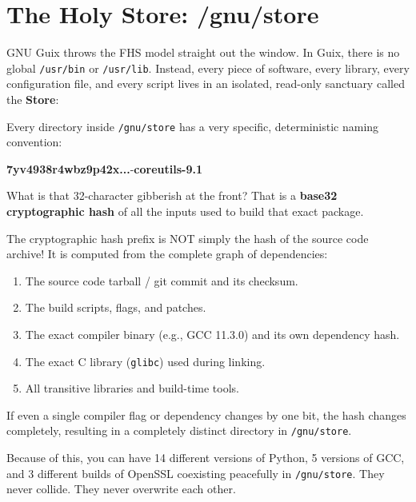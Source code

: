 \section{The Holy Store: /gnu/store}

GNU Guix throws the FHS model straight out the window. In Guix, there is no global \texttt{/usr/bin} or \texttt{/usr/lib}. Instead, every piece of software, every library, every configuration file, and every script lives in an isolated, read-only sanctuary called the \textbf{Store}:

\begin{center}
\end{center}

Every directory inside \texttt{/gnu/store} has a very specific, deterministic naming convention:

\begin{center}
\textbf{\color{alchpurple}7yv4938r4wbz9p42x...}-\textbf{\color{guixdark}coreutils-9.1}
\end{center}

What is that 32-character gibberish at the front? That is a \textbf{base32 cryptographic hash} of all the inputs used to build that exact package.

\begin{alchemybox}
The cryptographic hash prefix is NOT simply the hash of the source code archive! It is computed from the complete graph of dependencies:
\begin{enumerate}
  \item The source code tarball / git commit and its checksum.
  \item The build scripts, flags, and patches.
  \item The exact compiler binary (e.g., GCC 11.3.0) and its own dependency hash.
  \item The exact C library (\texttt{glibc}) used during linking.
  \item All transitive libraries and build-time tools.
\end{enumerate}
If even a single compiler flag or dependency changes by one bit, the hash changes completely, resulting in a completely distinct directory in \texttt{/gnu/store}.
\end{alchemybox}

Because of this, you can have 14 different versions of Python, 5 versions of GCC, and 3 different builds of OpenSSL coexisting peacefully in \texttt{/gnu/store}. They never collide. They never overwrite each other.

